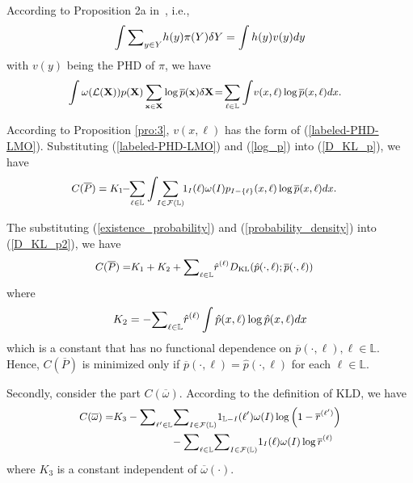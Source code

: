 \documentclass[journal]{IEEEtran}
\newcommand{\bX}{{\mathbf X}}
\newcommand{\bx}{{\mathbf x}}
\begin{document}
{According to  Proposition 2a in~\cite{refr:tracking-1}, i.e.,
\begin{equation}
{\small
\int {\sum}_{y\in Y}h(y)\pi(Y)\delta Y=\int h(y)v(y)dy}
\end{equation}
with $v(y)$ being the PHD of $\pi$, we have
\begin{equation}\label{log_p}
{\small
\begin{split}
&\int \omega(\mathcal{L}(\bX))p(\bX)\sum_{\bx\in\bX}\log\overline p(\bx)\delta\bX\!=\!\sum_{\ell\in\mathbb{L}}\int\!v(x,\ell)\log\overline p(x,\ell)d x.
\end{split}}
\end{equation}

According to Proposition \ref{pro:3}, $v(x,\ell)$  has the form of (\ref{labeled-PHD-LMO}). Substituting (\ref{labeled-PHD-LMO}) and (\ref{log_p}) into (\ref{D_KL_p}), we have
\begin{equation}\label{D_KL_p2}
{\small
\begin{split}
&C(\overline P)=K_1\!\!-\!\!\sum_{\ell\in\mathbb{L}}\int\!\!\sum_{I\in\mathcal{F}(\mathbb{L})}\!\!1_{I}(\ell)\omega(I)p_{I-\{\ell\}}(x,\ell)\log\overline p(x,\ell)dx.
\end{split}}
\end{equation}

The substituting (\ref{existence_probability}) and (\ref{probability_density}) into (\ref{D_KL_p2}), we have
\begin{equation}
{\small
\begin{split}
C(\overline P)=&K_1+K_2+{\sum}_{\ell\in\mathbb{L}}\hat r^{(\ell)}D_{\text{KL}}(\hat p(\cdot,\ell);\overline p(\cdot,\ell))
\end{split}}
\end{equation}
where
\begin{equation}
{\small
K_2=-{\sum}_{\ell\in\mathbb{L}}\hat r^{(\ell)} \int \hat p(x,\ell) \log \hat p(x,\ell)dx}
\end{equation}
which is  a constant that
has no functional dependence on  $\overline p(\cdot,\ell), \ell\in\mathbb{L}$.
Hence,  $C(\overline P)$ is minimized only if
$ \overline p(\cdot,\ell)=\hat p(\cdot,\ell)$ for each $\ell\in\mathbb{L}$.

Secondly, consider the part $C(\overline\omega)$.
According to the definition of KLD, we have
\begin{equation}\label{D_KL_w}
{\small
\begin{split}
C(\overline\omega)=&K_3-{\sum}_{\ell'\in\mathbb{L}}{\sum}_{I\in\mathcal{F}(\mathbb{L)}}1_{\mathbb{L}-I}(\ell')\omega(I)\log\left(1-\overline r^{(\ell')}\right)\\&\,\,\,\,\,\,\,\,\,\,\,\,\,\,\,\,\,\,\,\,\,\,\,\,\,\,\,\,\,\,\,\,\,-{\sum}_{\ell\in\mathbb{L}}{\sum}_{I\in\mathcal{F}(\mathbb{L)}}1_{I}(\ell)\omega(I)\log{\overline r^{(\ell)}}
\end{split}}
\end{equation}
where $K_3$ is a constant independent of $\overline\omega(\cdot)$.

}
\end{document}
